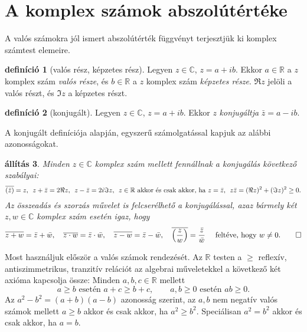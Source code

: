 \documentclass[a4paper, showtrims]{memoir}
\theoremstyle{plain}
\newtheorem{proposition}{állítás}[chapter]
\theoremstyle{remark}
\theoremstyle{definition}
\newtheorem{definition}[proposition]{definíció}
\begin{document}
\section{A komplex számok abszolútértéke}
A valós számokra jól ismert abszolútérték függvényt terjesztjük ki komplex számtest elemeire.
\begin{definition}[valós rész, képzetes rész]
	Legyen $z\in\mathbb{C}$, $z=a+ib$.
	Ekkor $a\in\mathbb{R}$ a $z$ komplex szám \emph{valós része},
	és $b\in\mathbb{R}$ a $z$ komplex szám \emph{képzetes része}.
	$\Re z$ jelöli a valós részt, és $\Im z$ a képzetes részt.
\end{definition}
\begin{definition}[konjugált]
	Legyen $z\in\mathbb{C}$, $z=a+ib$.
	Ekkor $z$ \emph{konjugáltja} $\bar{z}=a-ib$.
\end{definition}
A konjugált definíciója alapján, egyszerű számolgatással kapjuk az alábbi azonosságokat.
\begin{proposition}
	Minden $z\in\mathbb{C}$ komplex szám mellett fennállnak a konjugálás következő szabályai:
	\[
        \overline{\left( \bar{z} \right)}=z,\hspace{0.5em}
		z+\bar{z}=2\Re z,\hspace{0.5em}
		z-\bar{z}=2i\Im z,\hspace{0.5em}
		z\in\mathbb{R}\text{ akkor és csak akkor, ha } z=\bar{z},\hspace{0.5em}
		z\bar{z}=(\Re z)^2+(\Im z)^2\geq 0.
	\]
	Az összeadás és szorzás művelet is felcserélhető a konjugálással,
	azaz bármely két $z,w\in\mathbb{C}$ komplex szám esetén igaz, hogy
	\[
		\overline{z+w}=\bar{z}+\bar{w},\quad
		\overline{z\cdot w}=\bar{z}\cdot\bar{w},\quad
		\overline{z-w}=\bar{z}-\bar{w},\quad
		\overline{\left( \frac{z}{w} \right)}=\frac{\bar{z}}{\bar{w}}\quad\text{ feltéve, hogy }w\neq 0.\qedhere
	\]
\end{proposition}
Most használjuk először a valós számok rendezését.
Az $\mathbb{R}$ testen a $\geq $ reflexív, antiszimmetrikus, tranzitív relációt az algebrai műveletekkel a következő két axióma kapcsolja össze:
Minden $a,b,c\in\mathbb{R}$ mellett
\[
	a\geq b\text{ esetén }a+c\geq b+c,\qquad a,b\geq 0\text{ esetén }ab\geq 0.
\]
Az $a^2-b^2=\left( a+b \right)\left( a-b \right)$ azonosság szerint,
az $a,b$ nem negatív valós számok mellett $a\geq b$ akkor és csak akkor, ha $a^2\geq b^2$.
Speciálisan $a^2=b^2$ akkor és csak akkor, ha $a=b$.
\end{document}
